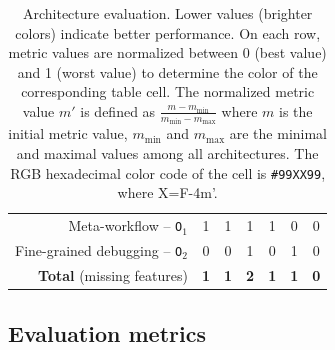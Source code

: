 \documentclass[preprint,3p,twocolumn]{elsarticle}
\newcommand{\note}[2]{\pdfmargincomment[color=yellow,author=#1,open=true]{#2}}
\newcommand{\closednote}[4]{} %
\begin{document}
\begin{table}
\begin{tabular}{rcccccc}
  Meta-workflow  -- \texttt{O$_1$}    & \cellcolor[HTML]{999999}1
                                     & \cellcolor[HTML]{999999}1
                                     & \cellcolor[HTML]{999999}1
                                     & \cellcolor[HTML]{999999}1
                                     & \cellcolor[HTML]{99FF99}0
                                     & \cellcolor[HTML]{99FF99}0\\
  Fine-grained debugging -- \texttt{O$_2$}   & \cellcolor[HTML]{99FF99}0
                                     & \cellcolor[HTML]{99FF99}0
                                     & \cellcolor[HTML]{999999}1
                                     & \cellcolor[HTML]{99FF99}0
                                     & \cellcolor[HTML]{999999}1
                                     & \cellcolor[HTML]{99FF99}0\\
  \textbf{Total} (missing features) & \cellcolor[HTML]{99CC99}\textbf{1}
                                     & \cellcolor[HTML]{99CC99}\textbf{1}
                                     & \cellcolor[HTML]{999999}\textbf{2}
                                     & \cellcolor[HTML]{99CC99}\textbf{1}
                                     & \cellcolor[HTML]{99CC99}\textbf{1}
                                     & \cellcolor[HTML]{99FF99}\textbf{0}\\
\end{tabular}

\caption{Architecture evaluation. Lower values (brighter colors) indicate better performance. On each row, metric values are
  normalized between 0 (best value) and 1 (worst value) to determine the
  color of the corresponding table cell. The normalized metric value $m'$ is
  defined as
  $\frac{m-m_{\mathrm{min}}}{m_{\mathrm{min}}-m_{\mathrm{max}}}$ where
  $m$ is the initial metric value, $m_{\mathrm{min}}$ and $m_{\mathrm{max}}$
  are the minimal and maximal values among all architectures. The RGB hexadecimal color code of the cell
  is \texttt{\#99XX99}, where X=F-4m'. \closednote{Tristan}{Use 6. Round to the nearest integer.}{Tristan}{Fixed.}}
\label{table:evaluation}
\end{table}

\subsection{Evaluation metrics}
\end{document}
